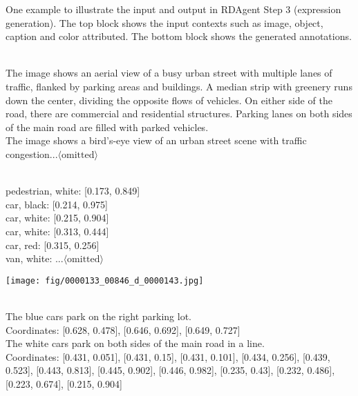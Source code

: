 





\begin{table*}[!h]
\caption{One example to illustrate the input and output in RDAgent Step 3 (expression generation). The top block shows the input contexts such as image, object, caption and color attributed. The bottom block shows the generated annotations.}
\label{gpt-ass}

\begin{tcolorbox}


\\
The image shows an aerial view of a busy urban street with multiple lanes of traffic, flanked by parking areas and buildings. A median strip with greenery runs down the center, dividing the opposite flows of vehicles. On either side of the road, there are commercial and residential structures. Parking lanes on both sides of the main road are filled with parked vehicles.\\
The image shows a bird's-eye view of an urban street scene with traffic congestion...$\langle\text{omitted}\rangle$ \\
\begin{minipage}{0.55\textwidth}
 \\
pedestrian, white: [0.173, 0.849]  \\
car, black: [0.214, 0.975]  \\
car, white: [0.215, 0.904] \\
car, white: [0.313, 0.444] \\
car, red: [0.315, 0.256] \\
van, white: ...$\langle\text{omitted}\rangle$\\
\end{minipage}
\begin{minipage}{0.4\textwidth}
    \centering
   \texttt{[image: fig/0000133\_00846\_d\_0000143.jpg]}
\end{minipage}
\tcblower
 \\
The blue cars park on the right parking lot.\\
Coordinates: [0.628, 0.478], [0.646, 0.692], [0.649, 0.727] \\
The white cars park on both sides of the main road in a line.\\
Coordinates: [0.431, 0.051], [0.431, 0.15], [0.431, 0.101], [0.434, 0.256], [0.439, 0.523], [0.443, 0.813], [0.445, 0.902], [0.446, 0.982], [0.235, 0.43], [0.232, 0.486], [0.223, 0.674], [0.215, 0.904]

\end{tcolorbox}

\end{table*}